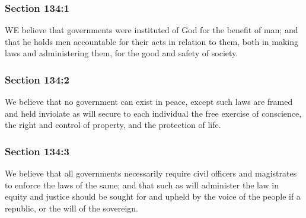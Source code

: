 	\subsubsection{Section 134:1} %
		\label{DC134-1}

		WE believe that governments were instituted of God for the benefit of man; and that he holds men accountable for their acts in relation to them, both in making laws and administering them, for the good and safety of society.


	\subsubsection{Section 134:2} %
		\label{DC134-2}

		We believe that no government can exist in peace, except such laws are framed and held inviolate as will secure to each individual the free exercise of conscience, the right and control of property, and the protection of life.


	\subsubsection{Section 134:3} %
		\label{DC134-3}

		We believe that all governments necessarily require civil officers and magistrates to enforce the laws of the same; and that such as will administer the law in equity and justice should be sought for and upheld by the voice of the people if a republic, or the will of the sovereign.

